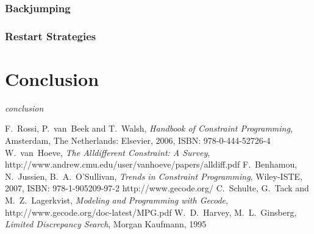 \documentclass[10pt,
               a4paper,
               journal,
               ]{IEEEtran}
\begin{document}
	\subsubsection{Backjumping}
	
	\subsubsection{Restart Strategies}
	
	\section{Conclusion}
	\textit{conclusion}
	
	\begin{thebibliography}{1}
		F.~Rossi, P.~van~Beek and T.~Walsh, \emph{Handbook of Constraint Programming}, Amsterdam, The Netherlands: Elsevier, 2006, ISBN: 978-0-444-52726-4
		W.~van~Hoeve, \emph{The Alldifferent Constraint: A Survey}, http://www.andrew.cmu.edu/user/vanhoeve/papers/alldiff.pdf
		F.~Benhamou, N.~Jussien, B.~A.~O'Sullivan, \emph{Trends in Constraint Programming}, Wiley-ISTE, 2007, ISBN: 978-1-905209-97-2
		http://www.gecode.org/
		C.~Schulte, G.~Tack and M.~Z.~Lagerkvist, \emph{Modeling and Programming with Gecode}, http://www.gecode.org/doc-latest/MPG.pdf
		W.~D.~Harvey, M.~L.~Ginsberg, \emph{Limited Discrepancy Search}, Morgan Kaufmann, 1995
	\end{thebibliography}
\end{document}
